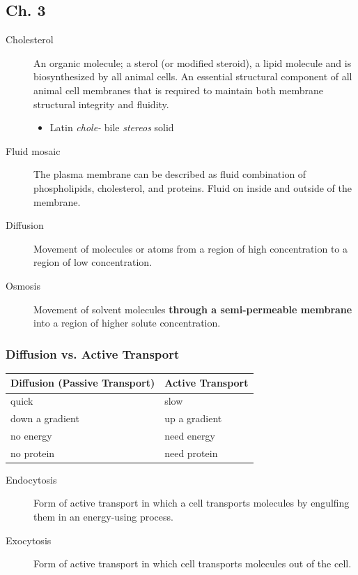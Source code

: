 \documentclass[11pt]{article}
\begin{document}
\subsection{Ch. 3}
\label{sec:org2aa29a1}
\begin{description}
\item[{Cholesterol}] An organic molecule; a sterol (or modified steroid), a lipid
molecule and is biosynthesized by all animal cells. An essential
structural component of all animal cell membranes that is required to
maintain both membrane structural integrity and fluidity.

\begin{itemize}
\item Latin \emph{chole-} bile \emph{stereos} solid
\end{itemize}

\item[{Fluid mosaic}] The plasma membrane can be described as fluid combination
of phospholipids, cholesterol, and proteins. Fluid on inside and outside
of the membrane.

\item[{Diffusion}] Movement of molecules or atoms from a region of high
concentration to a region of low concentration.

\item[{Osmosis}] Movement of solvent molecules \textbf{through a semi-permeable
membrane} into a region of higher solute concentration.
\end{description}

\subsubsection{Diffusion vs. Active Transport}
\label{sec:org02d679d}

\begin{center}
\begin{tabular}{ll}
Diffusion (Passive Transport) & Active Transport\\
\hline
quick & slow\\
down a gradient & up a gradient\\
no energy & need energy\\
no protein & need protein\\
\end{tabular}
\end{center}

\begin{description}
\item[{Endocytosis}] Form of active transport in which a cell transports
molecules by engulfing them in an energy-using process.

\item[{Exocytosis}] Form of active transport in which cell transports molecules
out of the cell.
\end{description}
\end{document}
